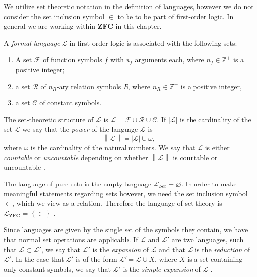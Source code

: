 \documentclass[../../main.tex]{subfiles}
\begin{document}
We utilize set theoretic notation in the definition of languages, however we do not consider the set inclusion symbol $\in$ to be to be part of first-order logic.
In general we are working within \textbf{ZFC} in this chapter.

\begin{definition}\label{language-def}\cite[Definition 1.1.1]{Mar02}
    A \textit{formal language} $\mathcal{L}$ in first order logic is associated with the following sets:
    \begin{enumerate}
        \item A set $\mathcal{F}$ of function symbols $f$ with $n_f$ arguments each, 
        where $n_f \in \mathbb{Z}^+$ is a positive integer;
        \item a set $\mathcal{R}$ of $n_R$-ary relation symbols $R$, 
        where $n_R \in \mathbb{Z}^+$ is a positive integer,
        \item a set $\mathcal{C}$ of constant symbols.
    \end{enumerate}
    The set-theoretic structure of $\mathcal{L}$ is $\mathcal{L} = \mathcal{F} \cup \mathcal{R} \cup \mathcal{C}$.
    If $\left\lvert \mathcal{L}\right\rvert$ is the cardinality of the set $\mathcal{L}$ we say that the \emph{power} of the language $\mathcal{L}$ is
    $$\left\lVert \mathcal{L}\right\rVert = \left\lvert\mathcal{L}\right\rvert \cup \omega,$$
    where $\omega$ is the cardinality of the natural numbers.
    We say that $\mathcal{L}$ is either \emph{countable} or \emph{uncountable} depending on whether $\left\lVert\mathcal{L}\right\rVert$ is countable or uncountable \cite[\S1.3]{Cha90}.
\end{definition}

The language of pure sets is the empty language $\mathcal{L}_{Set} = \varnothing$.
In order to make meaningful statements regarding sets however, we need the set inclusion symbol $\in$, which we view as a relation.
Therefore the language of set theory is $\mathcal{L}_{\textbf{ZFC}} = \left\{\in\right\}$ \cite[p.8]{Mar02}\cite[p.80]{Jec78}.

Since languages are given by the single set of the symbols they contain, we have that normal set operations are applicable.
If $\mathcal{L}$ and $\mathcal{L}'$ are two languages, such that $\mathcal{L} \subset \mathcal{L}'$, 
we say that $\mathcal{L}'$ is the \textit{expansion} of $\mathcal{L}$ and that $\mathcal{L}$ is the \textit{reduction} of $\mathcal{L}'$.
In the case that $\mathcal{L}'$ is of the form $\mathcal{L}'= \mathcal{L} \cup X$, where $X$ is a set containing only constant symbols, 
we say that $\mathcal{L}'$ is the \textit{simple expansion} of $\mathcal{L}$ \cite[p.19]{Cha90}.
\end{document}

